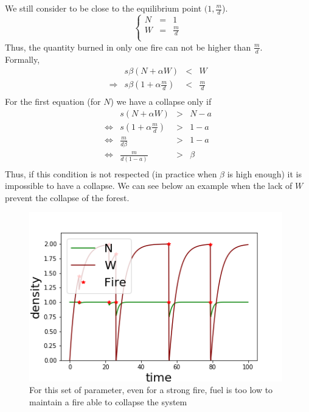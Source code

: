 \documentclass{article}
\begin{document}
We still consider to be close to the equilibrium point $(1, \frac{m}{d}$).
\[
\left\lbrace
\begin{array}{rcl}
     N & = & 1 \\
     W & = & \frac{m}{d} \\
\end{array}
\right.
\]
Thus, the quantity burned in only one fire can not be higher than $\frac{m}{d}$. \\
Formally,
\[
\begin{array}{crcl}
&s\beta(N+\alpha W) & < & W \\
\Rightarrow & s\beta(1+\alpha \frac{m}{d}) & < & \frac{m}{d} \\
\end{array}
\]
For the first equation (for $N$) we have a collapse only if
\[
\begin{array}{rccl}
                &  s(N+\alpha W) & > & N-a \\
\Leftrightarrow &  s(1+\alpha \frac{m}{d}) & > & 1-a \\ 
\Leftrightarrow &  \frac{m}{d\beta} & > & 1-a \\ 
\Leftrightarrow &  \frac{m}{d( 1-a)} & > & \beta \\ 
\end{array}
\]
Thus, if this condition is not respected (in practice when $\beta$ is high enough) it is impossible to have a collapse. We can see below  an example when the lack of $W$ prevent the collapse of the forest.


\begin{figure}[h!]
\centering
\includegraphics[width=11cm]{return_never_1.png}
\caption{For this set of parameter, even for a strong fire, fuel is too low to maintain a fire able to collapse the system}
\end{figure}
\end{document}
